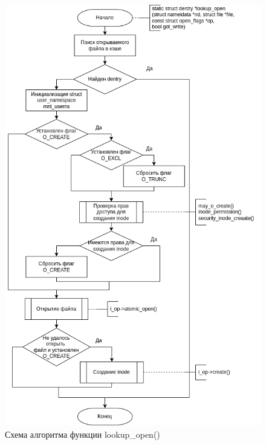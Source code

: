 \documentclass[14pt,a4paper]{scrreprt}
\begin{document}
\begin{figure}[H]
	\begin{center}
		\includegraphics[scale=0.65]{assets/lookup_open.png}
	\end{center}
	\caption{Схема алгоритма функции lookup\_open()}
\end{figure}
\end{document}
